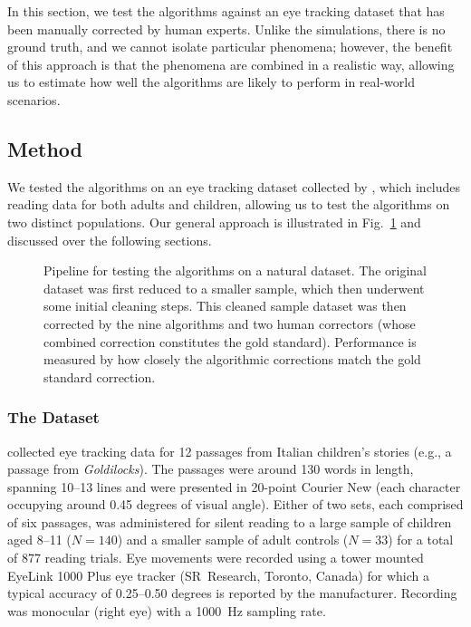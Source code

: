 \documentclass[doc,biblatex]{apa7}
\begin{document}
In this section, we test the algorithms against an eye tracking dataset that has been manually corrected by human experts. Unlike the simulations, there is no ground truth, and we cannot isolate particular phenomena; however, the benefit of this approach is that the phenomena are combined in a realistic way, allowing us to estimate how well the algorithms are likely to perform in real-world scenarios.

\subsection{Method}

We tested the algorithms on an eye tracking dataset collected by \textcite{Pescuma:0000}, which includes reading data for both adults and children, allowing us to test the algorithms on two distinct populations. Our general approach is illustrated in Fig.~\ref{fig07} and discussed over the following sections.

	\begin{figure}
	\vspace*{2pt}
	\caption{Pipeline for testing the algorithms on a natural dataset. The original dataset was first reduced to a smaller sample, which then underwent some initial cleaning steps. This cleaned sample dataset was then corrected by the nine algorithms and two human correctors (whose combined correction constitutes the gold standard). Performance is measured by how closely the algorithmic corrections match the gold standard correction.}
	\label{fig07}
	\end{figure}

\subsubsection{The Dataset}

\textcite{Pescuma:0000} collected eye tracking data for 12 passages from Italian children's stories (e.g., a passage from \textit{Goldilocks}). The passages were around 130 words in length, spanning 10--13 lines and were presented in 20-point Courier New (each character occupying around 0.45 degrees of visual angle). Either of two sets, each comprised of six passages, was administered for silent reading to a large sample of children aged 8--11 ($N=140$) and a smaller sample of adult controls ($N=33$) for a total of 877 reading trials. Eye movements were recorded using a tower mounted EyeLink 1000 Plus eye tracker (SR~Research, Toronto, Canada) for which a typical accuracy of 0.25--0.50 degrees is reported by the manufacturer. Recording was monocular (right eye) with a 1000~Hz sampling rate.
\end{document}
